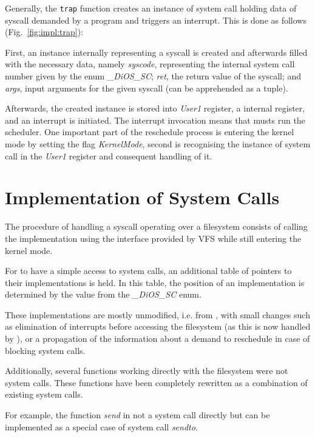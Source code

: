 Generally, the \texttt{trap} function creates an instance of system call holding data of syscall demanded by a program and triggers an interrupt. This is done as follows (Fig.~\ref{fig:impl:trap}):

First, an instance internally representing a syscall is created and afterwards filled with the necessary data, namely \textit{syscode}, representing the \dios internal system call number given by the enum  \textit{\_DiOS\_SC}; \textit{ret}, the return value of the syscall; and \textit{args}, input arguments for the given syscall (can be apprehended as a tuple).

Afterwards, the created instance is stored into \textit{User1} register, a \dios internal register, and an interrupt is initiated. The interrupt invocation means that \dios musts run the scheduler. One important part of the reschedule process is entering the kernel mode by setting the flag \textit{KernelMode}, second is recognising the instance of system call in the \textit{User1} register and consequent handling of it.

\section{Implementation of System Calls}  \label{sec:impl:impl}

The procedure of handling a syscall operating over a filesystem consists of calling the implementation using the interface provided by VFS while still entering the kernel mode.

 For \dios to have a simple access to system calls, an additional table of pointers to their implementations is held. In this table, the position of an implementation is determined by the value from the \textit{\_DiOS\_SC} enum.

These implementations are mostly unmodified, i.e. from , with small changes such as elimination of interrupts before accessing the filesystem (as this is now handled by \dios), or a propagation of the information about a demand to reschedule in case of blocking system calls.

 Additionally, several functions working directly with the filesystem were not system calls. These functions have been completely rewritten as a combination of existing system calls. 

For example, the function \textit{send} in not a system call directly but can be implemented as a special case of system call \textit{sendto}.



